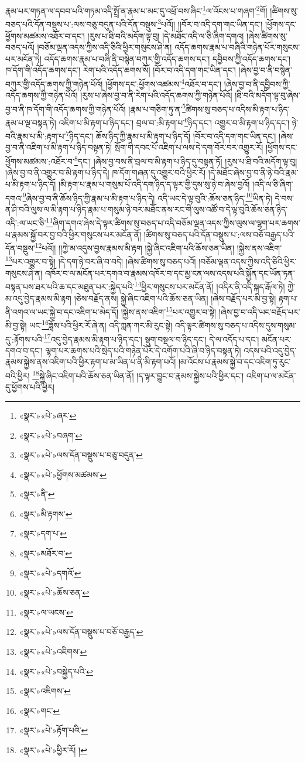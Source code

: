 རྣམ་པར་གཏན་ལ་དབབ་པའི་གཏམ་འདི་སྤྲོ་ན་རྣམ་པ་མང་དུ་འཕྲོ་བས་ཞིང་\footnote{«སྣར་»«པེ་»ཞར་}ལ་འོངས་པ་གཞག་\footnote{«སྣར་»«པེ་»བཞག་}གོ། །ཚིགས་སུ་བཅད་པའི་དོན་བསྡུས་པ་:ལས་བཅུ་བདུན་པའི་དོན་བསྡུས་\footnote{«སྣར་»«པེ་»ལས་དོན་བསྡུས་པ་བཅུ་བདུན་}པའོ།། །།བོར་བ་འདི་དག་གང་ཡིན་དང་། །ཕྱོགས་དང་ཕྱོགས་མཚམས་འཐོར་བ་དང་། །རུས་པ་ཐི་བའི་མདོག་ལྟ་བུ། །དེ་མཐོང་འདི་ལ་ཅི་ཞིག་དགའ། །ཞེས་ཚིགས་སུ་བཅད་པའོ། །བཅོམ་ལྡན་འདས་ཀྱིས་འདི་ཅིའི་ཕྱིར་གསུངས་ཤེ་ན། འདོད་ཆགས་རྣམ་པ་བཞིའི་གཉེན་པོར་གསུངས་པར་མངོན་ཏེ། འདོད་ཆགས་རྣམ་པ་བཞི་ནི་བསྙེན་བཀུར་གྱི་འདོད་ཆགས་དང་། དབྱིབས་ཀྱི་འདོད་ཆགས་དང་། ཁ་དོག་གི་འདོད་ཆགས་དང་། རེག་པའི་འདོད་ཆགས་སོ། །བོར་བ་འདི་དག་གང་ཡིན་དང་། །ཞེས་བྱ་བ་ནི་བསྙེན་བཀུར་གྱི་འདོད་ཆགས་ཀྱི་གཉེན་པོའོ། །ཕྱོགས་དང་:ཕྱོགས་འཚམས་\footnote{«སྣར་»«པེ་»ཕྱོགས་མཚམས་}འཐོར་བ་དང་། །ཞེས་བྱ་བ་ནི་དབྱིབས་ཀྱི་འདོད་ཆགས་ཀྱི་གཉེན་པོའོ། །རུས་པ་ཞེས་བྱ་བ་ནི་རེག་པའི་འདོད་ཆགས་ཀྱི་གཉེན་པོའོ། །ཐི་བའི་མདོག་ལྟ་བུ་ཞེས་བྱ་བ་ནི་ཁ་དོག་གི་འདོད་ཆགས་ཀྱི་གཉེན་པོའོ། །རྣམ་པ་གཅིག་ཏུ་ན་\footnote{«སྣར་»ནི་}ཚིགས་སུ་བཅད་པ་འདིས་མི་རྟག་པ་ཉིད་རྣམ་པ་ལྔ་བསྟན་ཏེ། འཇིག་པ་མི་རྟག་པ་ཉིད་དང་། བྲལ་བ་:མི་རྟག་པ་\footnote{«སྣར་»མི་རྟགས་}ཉིད་དང་། འགྱུར་བ་མི་རྟག་པ་ཉིད་དང་། ཉེ་བའི་རྣམ་པ་མི་:རྟག་པ་\footnote{«སྣར་»དག་པ་}ཉིད་དང་། ཆོས་ཉིད་ཀྱི་རྣམ་པ་མི་རྟག་པ་ཉིད་དོ། །བོར་བ་འདི་དག་གང་ཡིན་དང་། །ཞེས་བྱ་བ་ནི་འཇིག་པ་མི་རྟག་པ་ཉིད་བསྟན་ཏེ། སྲོག་གི་དབང་པོ་འཇིག་པ་ལས་དེ་དག་བོར་བར་འགྱུར་རོ། །ཕྱོགས་དང་ཕྱོགས་མཚམས་:འཐོར་བ་\footnote{«སྣར་»མཐོར་བ་}དང་། །ཞེས་བྱ་བས་ནི་བྲལ་བ་མི་རྟག་པ་ཉིད་དུ་བསྟན་ཏོ། །རུས་པ་ཐི་བའི་མདོག་ལྟ་བུ། །ཞེས་བྱ་བ་ནི་འགྱུར་བ་མི་རྟག་པ་ཉིད་དེ། ཁ་དོག་གཞན་དུ་འགྱུར་བའི་ཕྱིར་རོ། །དེ་མཐོང་ཞེས་བྱ་བ་ནི་ཉེ་བའི་རྣམ་པ་མི་རྟག་པ་ཉིད་དོ། །མི་རྟག་པ་རྣམ་པ་གསུམ་པོ་འདི་དག་ཉིད་ད་ལྟར་གྱི་དུས་སུ་ཉེ་བ་ཞེས་བྱའོ། །འདི་ལ་ཅི་ཞིག་དགའ་\footnote{«སྣར་»«པེ་»དགའོ་}ཞེས་བྱ་བ་ནི་ཆོས་ཉིད་ཀྱི་རྣམ་པ་མི་རྟག་པ་ཉིད་དེ། འདི་ཡང་དེ་ལྟ་བུའི་:ཆོས་ཅན་ཉིད་\footnote{«སྣར་»«པེ་»ཆོས་ཅན་}ཡིན་ཏེ། དེ་བས་ན་ཤི་བའི་ལུས་ལ་མི་རྟག་པ་ཉིད་རྣམ་པ་གསུམ་ཉེ་བར་མཐོང་ནས་རང་གི་ལུས་འཚོ་བ་དེ་ལྟ་བུའི་ཆོས་ཅན་ཉིད་འདི་:ལ་ཡང་ཅི་\footnote{«སྣར་»ལ་ཡངས་}ཞིག་དགའ་ཞེས་དེ་ལྟར་ཚིགས་སུ་བཅད་པ་འདི་བཅོམ་ལྡན་འདས་ཀྱིས་ལུས་ལ་ལྷག་པར་ཆགས་པ་རྣམས་སྐྱོ་བར་བྱ་བའི་ཕྱིར་གསུངས་པར་མངོན་ནོ། །ཚིགས་སུ་བཅད་པའི་དོན་བསྡུས་པ་:ལས་བཅོ་བརྒྱད་པའི་དོན་བསྡུས་\footnote{«སྣར་»«པེ་»ལས་དོན་བསྡུས་པ་བཅོ་བརྒྱད་}པའོ།། །།ཀྱེ་མ་འདུས་བྱས་རྣམས་མི་རྟག །སྐྱེ་ཞིང་འཇིག་པའི་ཆོས་ཅན་ཡིན། །སྐྱེས་ནས་འཇིག་\footnote{«སྣར་»«པེ་»འཇིགས་}པར་འགྱུར་བ་སྟེ། །དེ་དག་ཉེ་བར་ཞི་བ་བདེ། །ཞེས་ཚིགས་སུ་བཅད་པའོ། །བཅོམ་ལྡན་འདས་ཀྱིས་འདི་ཅིའི་ཕྱིར་གསུངས་ཤེ་ན། འཁོར་བ་ལ་མངོན་པར་དགའ་བ་རྣམས་འཁོར་བ་དང་མྱ་ངན་ལས་འདས་པའི་སྐྱོན་དང་ཡོན་ཏན་བསྟན་པས་ཐར་པའི་ཆ་དང་མཐུན་པར་:སྐྱེད་པའི་\footnote{«སྣར་»«པེ་»བསྐྱེད་པའི་}ཕྱིར་གསུངས་པར་མངོན་ནོ། །འདིར་ནི་འདི་སྐད་རྒོལ་ཏེ། ཀྱེ་མ་འདུ་བྱེད་རྣམས་མི་རྟག །ཅེས་བརྗོད་ནས། སྐྱེ་ཞིང་འཇིག་པའི་ཆོས་ཅན་ཡིན། །ཞེས་བརྗོད་པར་མི་བྱ་སྟེ། རྟག་པ་ནི་འགའ་ལ་ཡང་སྐྱེ་བ་དང་འཇིག་པ་མེད་དོ། །སྐྱེས་ནས་འཇིག་\footnote{«སྣར་»འཇིགས་}པར་འགྱུར་བ་སྟེ། །ཞེས་བྱ་བ་འདི་ཡང་བརྗོད་པར་མི་བྱ་སྟེ། ཡང་\footnote{«སྣར་»གང་}ཟློས་པའི་ཕྱིར་རོ་ཞེ་ན། འདི་ཀླན་ཀར་མི་རུང་སྟེ། འདི་ལྟར་ཚིགས་སུ་བཅད་པ་འདིས་དུས་གསུམ་དུ་:རྟོགས་པའི་\footnote{«སྣར་»«པེ་»རྟོག་པའི་}འདུ་བྱེད་རྣམས་མི་རྟག་པ་ཉིད་དང་། སྡུག་བསྔལ་བ་ཉིད་དང་། དེ་ལ་འདོད་པ་དང་། མངོན་པར་དགའ་བ་དང་། ལྷག་པར་ཆགས་པའི་སྲེད་པའི་གཉེན་པོར་དེ་འགོག་པའི་ཞི་བ་ཉིད་བསྟན་ཏེ། འདས་པའི་འདུ་བྱེད་རྣམས་སྐྱེས་ནས་འཇིག་པའི་ཕྱིར་རྟག་པ་མ་ཡིན་པ་ནི་མི་རྟག་པའོ། །མ་འོངས་པ་རྣམས་སྐྱེ་བ་དང་འཇིག་ཏུ་རུང་བའི་ཕྱིར། \footnote{«སྣར་»«པེ་»ཕྱིར་རོ། ། }སྐྱེ་ཞིང་འཇིག་པའི་ཆོས་ཅན་ཡིན་ནོ། །ད་ལྟར་བྱུང་བ་རྣམས་སྐྱེས་པའི་ཕྱིར་དང་། འཇིག་པ་ལ་མངོན་དུ་ཕྱོགས་པའི་ཕྱིར། 